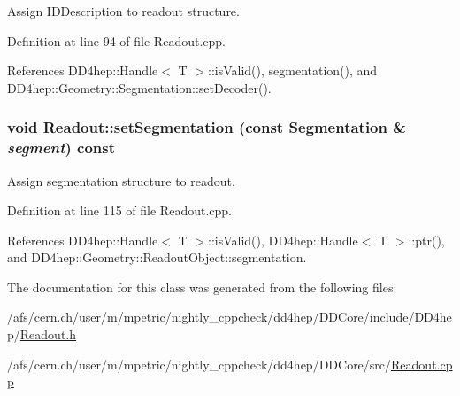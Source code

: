 Assign IDDescription to readout structure. 

Definition at line 94 of file Readout.cpp.

References DD4hep::Handle$<$ T $>$::isValid(), segmentation(), and DD4hep::Geometry::Segmentation::setDecoder().\hypertarget{class_d_d4hep_1_1_geometry_1_1_readout_a15905d5ccdd52d5c1b1c5f4505f7c76d}{
\subsubsection[{setSegmentation}]{\setlength{\rightskip}{0pt plus 5cm}void Readout::setSegmentation (const {\bf Segmentation} \& {\em segment}) const}}
\label{class_d_d4hep_1_1_geometry_1_1_readout_a15905d5ccdd52d5c1b1c5f4505f7c76d}


Assign segmentation structure to readout. 

Definition at line 115 of file Readout.cpp.

References DD4hep::Handle$<$ T $>$::isValid(), DD4hep::Handle$<$ T $>$::ptr(), and DD4hep::Geometry::ReadoutObject::segmentation.

The documentation for this class was generated from the following files:\begin{DoxyCompactItemize}
\item 
/afs/cern.ch/user/m/mpetric/nightly\_\-cppcheck/dd4hep/DDCore/include/DD4hep/\hyperlink{_readout_8h}{Readout.h}\item 
/afs/cern.ch/user/m/mpetric/nightly\_\-cppcheck/dd4hep/DDCore/src/\hyperlink{_readout_8cpp}{Readout.cpp}\end{DoxyCompactItemize}
